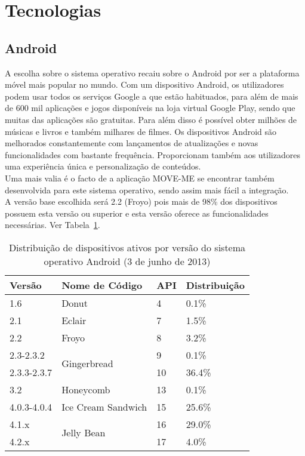 \section{Tecnologias}

\subsection{Android}

A escolha sobre o sistema operativo recaiu sobre o Android por ser a plataforma móvel mais popular no mundo. Com um dispositivo Android, os utilizadores podem usar todos os serviços Google a que estão habituados, para além de mais de 600 mil aplicações e jogos disponíveis na loja virtual Google Play, sendo que muitas das aplicações são gratuitas. Para além disso é possível obter milhões de músicas e livros e também milhares de filmes. Os dispositivos Android são melhorados constantemente com lançamentos de atualizações e novas funcionalidades com bastante frequência. Proporcionam também aos utilizadores uma experiência única e personalização de conteúdos.
\\Uma mais valia é o facto de a aplicação MOVE-ME se encontrar também desenvolvida para este sistema operativo, sendo assim mais fácil a integração.
\\A versão base escolhida será 2.2 (Froyo) pois mais de 98\% dos dispositivos possuem esta versão ou superior e esta versão oferece as funcionalidades necessárias. Ver Tabela~\ref{tab:android}.

\begin{table}[t]
  \centering
  \caption{Distribuição de dispositivos ativos por versão do sistema operativo Android (3 de junho de 2013)\cite{dashboards}}
\begin{tabular}{p{20mm} p{45mm} p{10mm} p{20mm} }
	\hline
\textbf{Versão} & \textbf{Nome de Código} & \textbf{API} & \textbf{Distribuição}\\
	\hline
	\hline
	1.6 & Donut & 4 & 0.1\%\\\hline
	2.1 & Eclair & 7 & 1.5\%\\\hline
	2.2 & Froyo & 8 & 3.2\%\\\hline
	2.3-2.3.2 & \multirow{2}{*}{Gingerbread} & 9 & 0.1\%\\
	2.3.3-2.3.7 & & 10 & 36.4\%\\\hline
	3.2 & Honeycomb & 13 & 0.1\%\\\hline
	4.0.3-4.0.4 & Ice Cream Sandwich & 15 & 25.6\%\\\hline
	4.1.x & \multirow{2}{*}{Jelly Bean} & 16 & 29.0\%\\
	4.2.x & & 17 & 4.0\%\\\hline
\end{tabular}
  \label{tab:android}
\end{table}

